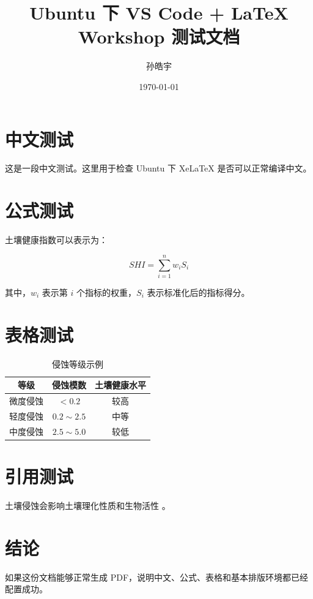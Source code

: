 \documentclass[UTF8,a4paper,12pt]{ctexart}
\title{Ubuntu 下 VS Code + LaTeX Workshop 测试文档}
\author{孙皓宇}
\date{\today}
\begin{document}
\maketitle

\section{中文测试}

这是一段中文测试。这里用于检查 Ubuntu 下 XeLaTeX 是否可以正常编译中文。

\section{公式测试}

土壤健康指数可以表示为：

\begin{equation}
SHI = \sum_{i=1}^{n} w_i S_i
\end{equation}

其中，$w_i$ 表示第 $i$ 个指标的权重，$S_i$ 表示标准化后的指标得分。

\section{表格测试}

\begin{table}[H]
\centering
\caption{侵蚀等级示例}
\begin{tabular}{ccc}
\toprule
等级 & 侵蚀模数 & 土壤健康水平 \\
\midrule
微度侵蚀 & $<0.2$ & 较高 \\
轻度侵蚀 & $0.2\sim2.5$ & 中等 \\
中度侵蚀 & $2.5\sim5.0$ & 较低 \\
\bottomrule
\end{tabular}
\end{table}

\section{引用测试}
土壤侵蚀会影响土壤理化性质和生物活性 \cite{soil2024}。

\section{结论}

如果这份文档能够正常生成 PDF，说明中文、公式、表格和基本排版环境都已经配置成功。

\printbibliography
\end{document}
